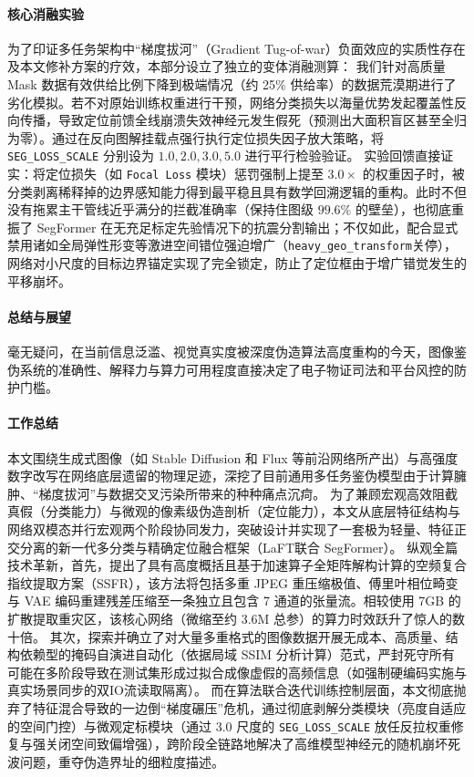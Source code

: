 \documentclass[10pt,a4paper,twocolumn]{ctexart}
\begin{document}
\paragraph{核心消融实验}
为了印证多任务架构中“梯度拔河”（Gradient Tug-of-war）负面效应的实质性存在及本文修补方案的疗效，本部分设立了独立的变体消融测算：
我们针对高质量 Mask 数据有效供给比例下降到极端情况（约 25\% 供给率）的数据荒漠期进行了劣化模拟。若不对原始训练权重进行干预，网络分类损失以海量优势发起覆盖性反向传播，导致定位前馈全线崩溃失效神经元发生假死（预测出大面积盲区甚至全归为零）。通过在反向图解挂载点强行执行定位损失因子放大策略，将 \texttt{SEG\_LOSS\_SCALE} 分别设为 ${1.0, 2.0, 3.0, 5.0}$ 进行平行检验验证。
实验回馈直接证实：将定位损失（如 \texttt{Focal Loss} 模块）惩罚强制上提至 $3.0 \times$ 的权重因子时，被分类剥离稀释掉的边界感知能力得到最平稳且具有数学回溯逻辑的重构。此时不但没有拖累主干管线近乎满分的拦截准确率（保持住图级 $99.6\%$ 的壁垒），也彻底重振了 SegFormer 在无充足标定先验情况下的抗震分割输出；不仅如此，配合显式禁用诸如全局弹性形变等激进空间错位强迫增广（\texttt{heavy\_geo\_transform}关停），网络对小尺度的目标边界锚定实现了完全锁定，防止了定位框由于增广错觉发生的平移崩坏。

\paragraph{总结与展望}
毫无疑问，在当前信息泛滥、视觉真实度被深度伪造算法高度重构的今天，图像鉴伪系统的准确性、解释力与算力可用程度直接决定了电子物证司法和平台风控的防护门槛。

\paragraph{工作总结}
本文围绕生成式图像（如 Stable Diffusion 和 Flux 等前沿网络所产出）与高强度数字改写在网络底层遗留的物理足迹，深挖了目前通用多任务鉴伪模型由于计算臃肿、“梯度拔河”与数据交叉污染所带来的种种痛点沉疴。
为了兼顾宏观高效阻截真假（分类能力）与微观的像素级伪造剖析（定位能力），本文从底层特征结构与网络双模态并行宏观两个阶段协同发力，突破设计并实现了一套极为轻量、特征正交分离的新一代多分类与精确定位融合框架（LaFT联合 SegFormer）。
纵观全篇技术革新，首先，提出了具有高度概括且基于加速算子全矩阵解构计算的空频复合指纹提取方案（SSFR），该方法将包括多重 JPEG 重压缩极值、傅里叶相位畸变与 VAE 编码重建残差压缩至一条独立且包含 7 通道的张量流。相较使用 7GB 的扩散提取重灾区，该核心网络（微缩至约 3.6M 总参）的算力时效跃升了惊人的数十倍。
其次，探索并确立了对大量多重格式的图像数据开展无成本、高质量、结构依赖型的掩码自演进自动化（依据局域 SSIM 分析计算）范式，严封死守所有可能在多阶段导致在测试集形成过拟合成像虚假的高频信息（如强制硬编码实施与真实场景同步的双IO流读取隔离）。
而在算法联合迭代训练控制层面，本文彻底抛弃了特征混合导致的一边倒“梯度碾压”危机，通过彻底剥解分类模块（亮度自适应的空间门控）与微观定标模块（通过 $3.0$ 尺度的 \texttt{SEG\_LOSS\_SCALE} 放任反拉权重修复与强关闭空间致偏增强），跨阶段全链路地解决了高维模型神经元的随机崩坏死波问题，重夺伪造界址的细粒度描述。
\end{document}
